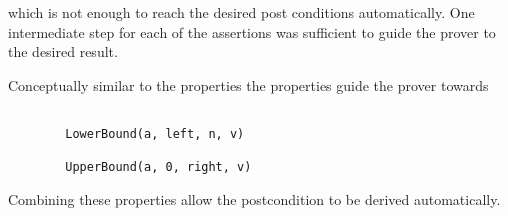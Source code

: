 which is not enough to reach the desired post conditions automatically.
One intermediate step for each of the assertions was sufficient to guide
the prover to the desired result.

Conceptually similar to the  properties
the  properties guide the prover towards

\begin{lstlisting}[style=acsl-block]

        LowerBound(a, left, n, v) 

        UpperBound(a, 0, right, v)
\end{lstlisting}

Combining these properties allow the postcondition  to be derived automatically.


